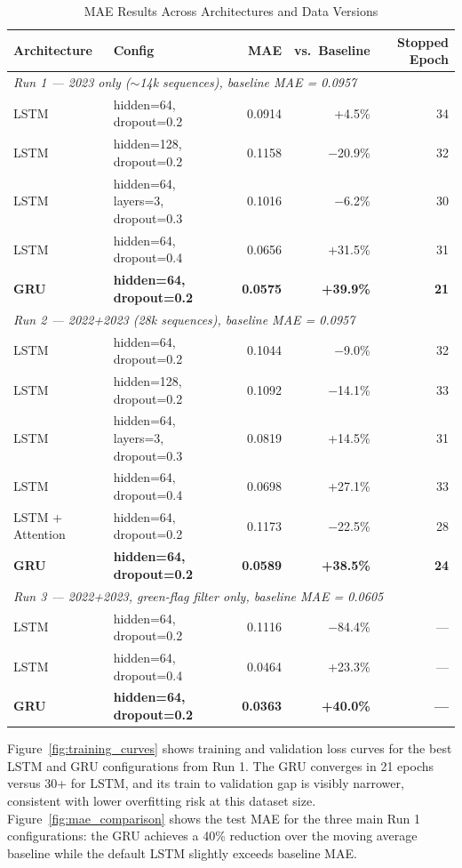 \begin{table}[ht]
\centering
\caption{MAE Results Across Architectures and Data Versions}
\label{tab:architectures}
\begin{tabular}{llrrr}
\toprule
Architecture & Config & MAE & vs.\ Baseline & Stopped Epoch \\
\midrule
\multicolumn{5}{l}{\textit{Run 1 --- 2023 only ($\sim$14k sequences), baseline MAE = 0.0957}} \\
LSTM & hidden=64, dropout=0.2 & 0.0914 & +4.5\% & 34 \\
LSTM & hidden=128, dropout=0.2 & 0.1158 & $-$20.9\% & 32 \\
LSTM & hidden=64, layers=3, dropout=0.3 & 0.1016 & $-$6.2\% & 30 \\
LSTM & hidden=64, dropout=0.4 & 0.0656 & +31.5\% & 31 \\
\textbf{GRU} & \textbf{hidden=64, dropout=0.2} & \textbf{0.0575} & \textbf{+39.9\%} & \textbf{21} \\
\midrule
\multicolumn{5}{l}{\textit{Run 2 --- 2022+2023 (28k sequences), baseline MAE = 0.0957}} \\
LSTM & hidden=64, dropout=0.2 & 0.1044 & $-$9.0\% & 32 \\
LSTM & hidden=128, dropout=0.2 & 0.1092 & $-$14.1\% & 33 \\
LSTM & hidden=64, layers=3, dropout=0.3 & 0.0819 & +14.5\% & 31 \\
LSTM & hidden=64, dropout=0.4 & 0.0698 & +27.1\% & 33 \\
LSTM + Attention & hidden=64, dropout=0.2 & 0.1173 & $-$22.5\% & 28 \\
\textbf{GRU} & \textbf{hidden=64, dropout=0.2} & \textbf{0.0589} & \textbf{+38.5\%} & \textbf{24} \\
\midrule
\multicolumn{5}{l}{\textit{Run 3 --- 2022+2023, green-flag filter only, baseline MAE = 0.0605}} \\
LSTM & hidden=64, dropout=0.2 & 0.1116 & $-$84.4\% & --- \\
LSTM & hidden=64, dropout=0.4 & 0.0464 & +23.3\% & --- \\
\textbf{GRU} & \textbf{hidden=64, dropout=0.2} & \textbf{0.0363} & \textbf{+40.0\%} & \textbf{---} \\
\bottomrule
\end{tabular}
\end{table}

Figure~\ref{fig:training_curves} shows training and validation loss curves for the best LSTM and GRU configurations from Run 1. 
The GRU converges in 21 epochs versus 30+ for LSTM, and its train to validation gap is visibly narrower, consistent with lower overfitting risk at 
this dataset size. Figure~\ref{fig:mae_comparison} shows the test MAE for the three main Run 1 configurations: the GRU achieves a 40\% reduction 
over the moving average baseline while the default LSTM slightly exceeds baseline MAE.

